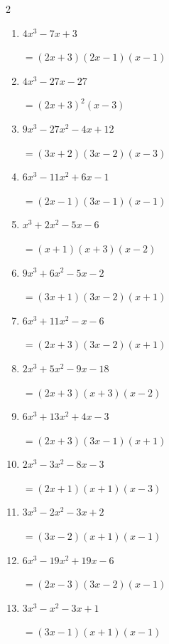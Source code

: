 \begin{multicols}{2}
\begin{enumerate}
  \item $4x^{3}-7x+3$

        $=(2x+3)(2x-1)(x-1)$

  \item $4x^{3}-27x-27$

        $=(2x+3) ^{ 2 }(x-3)$

  \item $9x^{3}-27x^{2}-4x+12$

        $=(3x+2)(3x-2)(x-3)$

\columnbreak %

\resetques

  \item $6x^{3}-11x^{2}+6x-1$

        $=(2x-1)(3x-1)(x-1)$

  \item $x^{3}+2x^{2}-5x-6$

        $=(x+1)(x+3)(x-2)$

  \item $9x^{3}+6x^{2}-5x-2$

        $=(3x+1)(3x-2)(x+1)$

  \item $6x^{3}+11x^{2}-x-6$

        $=(2x+3)(3x-2)(x+1)$

  \item $2x^{3}+5x^{2}-9x-18$

        $=(2x+3)(x+3)(x-2)$

\columnbreak %

  \item $6x^{3}+13x^{2}+4x-3$

        $=(2x+3)(3x-1)(x+1)$

  \item $2x^{3}-3x^{2}-8x-3$

        $=(2x+1)(x+1)(x-3)$

  \item $3x^{3}-2x^{2}-3x+2$

        $=(3x-2)(x+1)(x-1)$

  \item $6x^{3}-19x^{2}+19x-6$

        $=(2x-3)(3x-2)(x-1)$

  \item $3x^{3}-x^{2}-3x+1$

        $=(3x-1)(x+1)(x-1)$

\end{enumerate}
\end{multicols}
